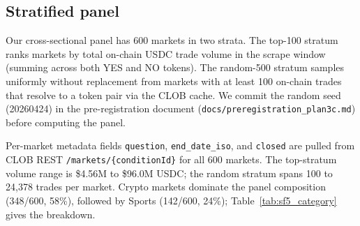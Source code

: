 \subsection{Stratified panel}
\label{ssec:panel}

Our cross-sectional panel has 600 markets in two strata. The top-100
stratum ranks markets by total on-chain USDC trade volume in the
scrape window (summing across both YES and NO tokens). The random-500
stratum samples uniformly without replacement from markets with at
least 100 on-chain trades that resolve to a token pair via the CLOB
cache. We commit the random seed (20260424) in the pre-registration
document (\texttt{docs/preregistration\_plan3c.md}) before computing
the panel.

Per-market metadata fields
\texttt{question},
\texttt{end\_date\_iso},
and \texttt{closed}
are pulled from CLOB REST
\texttt{/markets/\allowbreak\{conditionId\}}
for all 600 markets. The top-stratum
volume range is \$4.56M to \$96.0M USDC; the random stratum spans
100 to 24{,}378 trades per market. Crypto markets dominate the panel
composition (348/600, 58\%), followed by Sports (142/600, 24\%);
Table~\ref{tab:sf5_category} gives the breakdown.
